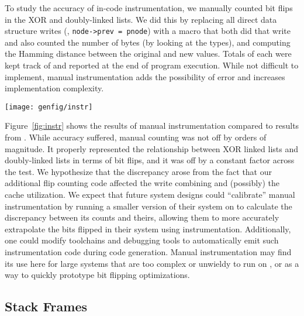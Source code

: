 To study the accuracy of in-code instrumentation, we
manually counted bit flips in the XOR and doubly-linked lists.
We did this by replacing all direct data structure writes (\eg, \texttt{node->prev =
	pnode}) with a macro that both did that write and also counted the number of bytes (by looking
at the types), and computing the Hamming distance between the original and new values. Totals of
each were kept track of and reported at the end of program execution. While not difficult to
implement, manual instrumentation adds the possibility of error and increases implementation
complexity.

\begin{SCfigure}
	\centering
	\texttt{[image: genfig/instr]}
	\caption{Manual instrumentation for counting bit flips (instr) compared to
		full-system simulation (sim).}
	\label{fig:instr}
\end{SCfigure}


Figure~\ref{fig:instr} shows the results of manual instrumentation compared to
results from \gem. While accuracy suffered, manual counting was not off by
orders of magnitude. It properly represented the relationship between XOR
linked lists and doubly-linked lists in terms of bit flips, and it was off by a
constant factor across the test. We hypothesize that the discrepancy arose from the fact that our
additional flip counting code affected the write combining and (possibly) the cache
utilization. We expect that
future system designs could ``calibrate'' manual instrumentation by running
a smaller version of their system on \gem to calculate the discrepancy between
its counts and theirs, allowing them to more accurately extrapolate the bits
flipped
in their system using instrumentation. Additionally, one could modify
toolchains and debugging tools to automatically emit such instrumentation code
during code generation. Manual instrumentation may find its use here for large systems that are too
complex or unwieldy to run on \gem, or as a way to quickly prototype bit flipping optimizations.


\subsection{Stack Frames}

